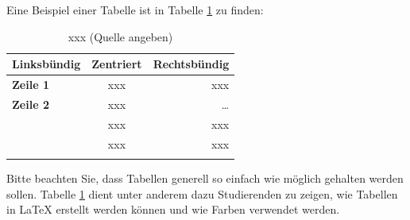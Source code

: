 Eine Beispiel einer Tabelle ist in Tabelle \ref{tab:xxx} zu finden:
\begin{table}
	\centering
	\begin{tabular}{| >{\bfseries}l | c | r | }
		\hline
			\rowcolor{orange} \bfseries Linksbündig & \bfseries Zentriert & \bfseries Rechtsbündig \\
		\hline
		\hline
			Zeile 1 & xxx & xxx \\\hline
			Zeile 2 & xxx & \dots \\\hline
			\multirow{2}{*}{Zeile3}
			& xxx & xxx \\\cline{2-3}
			& xxx & xxx \\\hline
		\hline
			\multicolumn{3}{| c |}{xxx} \\\hline
	\end{tabular}
	\caption{xxx (Quelle angeben)}
	\label{tab:xxx}
\end{table}

Bitte beachten Sie, dass Tabellen generell so einfach wie möglich gehalten werden sollen. Tabelle \ref{tab:xxx} dient unter anderem dazu Studierenden zu zeigen, wie Tabellen in \LaTeX\xspace erstellt werden können und wie Farben verwendet werden.